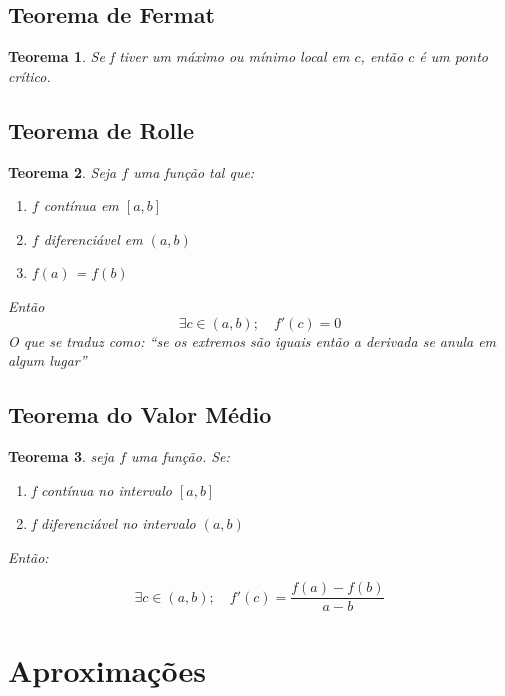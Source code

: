 \documentclass[14pt]{extreport}
\newtheorem{theorem}{Teorema}
\theoremstyle{definition}
\begin{document}
\section{Teorema de Fermat}

\begin{theorem}
    Se f tiver um máximo ou mínimo local em \(c\), então \(c\) é um ponto crítico.
\end{theorem}

\section{Teorema de Rolle}

\begin{theorem}
    Seja \(f\) uma função tal que:
    \begin{enumerate}
        \item \(f\) contínua em \([a,b]\)
        \item \(f\) diferenciável em \((a,b)\)
        \item \(f(a)\) = \(f(b)\)
    \end{enumerate}
    Então
    \begin{equation}
        \exists c \in (a,b);\quad f'(c) = 0
    \end{equation}
    O que se traduz como: ``se os extremos são iguais então a derivada se anula em algum lugar''
\end{theorem}

\section{Teorema do Valor Médio}
\begin{theorem}
    seja \(f\) uma função. Se:
    \begin{enumerate}
        \item f contínua no intervalo \( [a,b] \)
        \item f diferenciável no intervalo \( (a,b) \)
    \end{enumerate}
    Então:
    
    \begin{equation}
        \exists c \in (a,b);\quad f'(c) = \frac{f(a) - f(b)}{a - b}
    \end{equation}    
\end{theorem}

\chapter{Aproximações}
\end{document}

